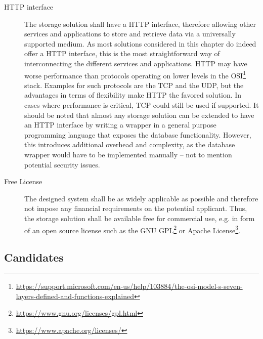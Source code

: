 \begin{description}
\item [HTTP interface]
The storage solution shall have a \ac{HTTP} interface, therefore allowing other services and applications to store and retrieve data via a universally supported medium.
As most solutions considered in this chapter do indeed offer a \ac{HTTP} interface, this is the most straightforward way of interconnecting the different services and applications.
\ac{HTTP} may have worse performance than protocols operating on lower levels in the \ac{OSI}\footnote{\url{https://support.microsoft.com/en-us/help/103884/the-osi-model-s-seven-layers-defined-and-functions-explained}} stack.
Examples for such protocols are the \ac{TCP} and the \ac{UDP}, but the advantages in terms of flexibility make \ac{HTTP} the favored solution.
In cases where performance is critical, TCP could still be used if supported.
It should be noted that almost any storage solution can be extended to have an \ac{HTTP} interface by writing a wrapper in a general purpose programming language that exposes the database functionality.
However, this introduces additional overhead and complexity, as the database wrapper would have to be implemented manually -- not to mention potential security issues.
\item [Free License]
The designed system shall be as widely applicable as possible and therefore not impose any financial requirements on the potential applicant.
Thus, the storage solution shall be available free for commercial use, e.g. in form of an open source license such as the GNU GPL\footnote{\url{https://www.gnu.org/licenses/gpl.html}} or Apache License\footnote{\url{https://www.apache.org/licenses/}}.
\end{description}


\subsection{Candidates}

